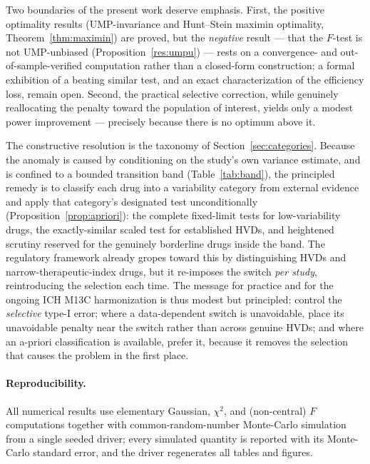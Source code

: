 \documentclass[11pt]{article}
\theoremstyle{remark}
\begin{document}
Two boundaries of the present work deserve emphasis. First, the positive optimality results (UMP-invariance and Hunt--Stein maximin optimality, Theorem~\ref{thm:maximin}) are proved, but the \emph{negative} result --- that the $F$-test is not UMP-unbiased (Proposition~\ref{res:umpu}) --- rests on a convergence- and out-of-sample-verified computation rather than a closed-form construction; a formal exhibition of a beating similar test, and an exact characterization of the efficiency loss, remain open. Second, the practical selective correction, while genuinely reallocating the penalty toward the population of interest, yields only a modest power improvement --- precisely because there is no optimum above it.

The constructive resolution is the taxonomy of Section~\ref{sec:categories}. Because the anomaly is caused by conditioning on the study's own variance estimate, and is confined to a bounded transition band (Table~\ref{tab:band}), the principled remedy is to classify each drug into a variability category from external evidence and apply that category's designated test unconditionally (Proposition~\ref{prop:apriori}): the complete fixed-limit tests for low-variability drugs, the exactly-similar scaled test for established HVDs, and heightened scrutiny reserved for the genuinely borderline drugs inside the band. The regulatory framework already gropes toward this by distinguishing HVDs and narrow-therapeutic-index drugs, but it re-imposes the switch \emph{per study}, reintroducing the selection each time. The message for practice and for the ongoing ICH M13C harmonization \citep{ich_m13} is thus modest but principled: control the \emph{selective} type-I error; where a data-dependent switch is unavoidable, place its unavoidable penalty near the switch rather than across genuine HVDs; and where an a-priori classification is available, prefer it, because it removes the selection that causes the problem in the first place.

\paragraph{Reproducibility.} All numerical results use elementary Gaussian, $\chi^2$, and (non-central) $F$ computations together with common-random-number Monte-Carlo simulation from a single seeded driver; every simulated quantity is reported with its Monte-Carlo standard error, and the driver regenerates all tables and figures.
\end{document}
